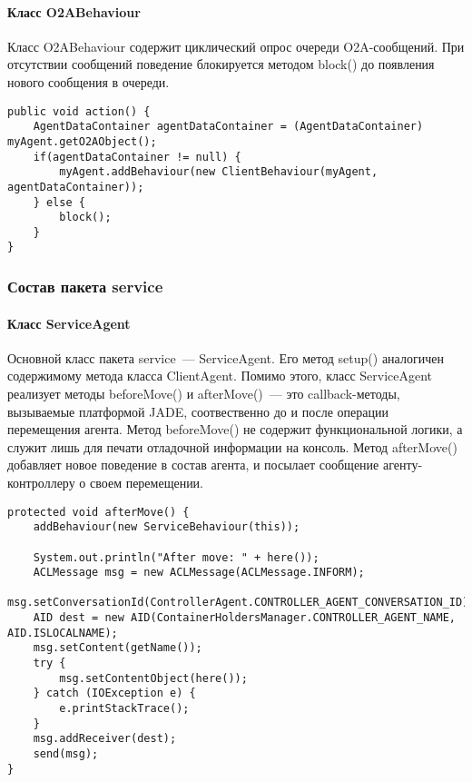 \paragraph{Класс O2ABehaviour}
Класс O2ABehaviour содержит циклический опрос очереди O2A-сообщений. При отсутствии сообщений поведение блокируется методом block() до появления нового сообщения в очереди.
\begin{verbatim}
public void action() {
    AgentDataContainer agentDataContainer = (AgentDataContainer) myAgent.getO2AObject();
    if(agentDataContainer != null) {
        myAgent.addBehaviour(new ClientBehaviour(myAgent, agentDataContainer));
    } else {
        block();
    }
}
\end{verbatim}

\subsubsection{Состав пакета service}
\paragraph{Класс ServiceAgent}
Основной класс пакета service~--- ServiceAgent. Его метод setup() аналогичен содержимому метода класса ClientAgent. Помимо этого, класс ServiceAgent реализует методы beforeMove() и afterMove()~--- это callback-методы, вызываемые платформой JADE, соотвественно до и после операции перемещения агента. Метод beforeMove() не содержит функциональной логики, а служит лишь для печати отладочной информации на консоль. Метод afterMove() добавляет новое поведение в состав агента, и посылает сообщение агенту-контроллеру о своем перемещении.
\begin{verbatim}
protected void afterMove() {
    addBehaviour(new ServiceBehaviour(this));

    System.out.println("After move: " + here());
    ACLMessage msg = new ACLMessage(ACLMessage.INFORM);
    msg.setConversationId(ControllerAgent.CONTROLLER_AGENT_CONVERSATION_ID);
    AID dest = new AID(ContainerHoldersManager.CONTROLLER_AGENT_NAME, AID.ISLOCALNAME);
    msg.setContent(getName());
    try {
        msg.setContentObject(here());
    } catch (IOException e) {
        e.printStackTrace();
    }
    msg.addReceiver(dest);
    send(msg);
}
\end{verbatim}
